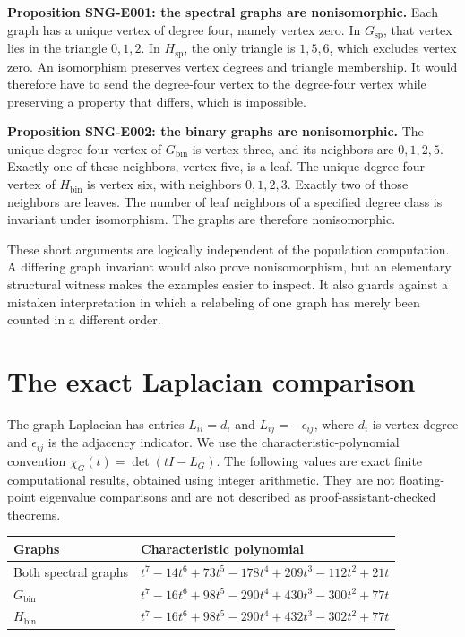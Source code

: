 \documentclass[
  11pt,
  a4paper,
]{report}
\begin{document}
\textbf{Proposition SNG-E001: the spectral graphs are nonisomorphic.}
Each graph has a unique vertex of degree four, namely vertex zero. In
\(G_{\mathrm{sp}}\), that vertex lies in the triangle \(0,1,2\). In
\(H_{\mathrm{sp}}\), the only triangle is \(1,5,6\), which excludes
vertex zero. An isomorphism preserves vertex degrees and triangle
membership. It would therefore have to send the degree-four vertex to
the degree-four vertex while preserving a property that differs, which
is impossible.

\textbf{Proposition SNG-E002: the binary graphs are nonisomorphic.} The
unique degree-four vertex of \(G_{\mathrm{bin}}\) is vertex three, and
its neighbors are \(0,1,2,5\). Exactly one of these neighbors, vertex
five, is a leaf. The unique degree-four vertex of \(H_{\mathrm{bin}}\)
is vertex six, with neighbors \(0,1,2,3\). Exactly two of those
neighbors are leaves. The number of leaf neighbors of a specified degree
class is invariant under isomorphism. The graphs are therefore
nonisomorphic.

These short arguments are logically independent of the population
computation. A differing graph invariant would also prove
nonisomorphism, but an elementary structural witness makes the examples
easier to inspect. It also guards against a mistaken interpretation in
which a relabeling of one graph has merely been counted in a different
order.

\hypertarget{the-exact-laplacian-comparison}{%
\section{The exact Laplacian
comparison}\label{the-exact-laplacian-comparison}}

The graph Laplacian has entries \(L_{ii}=d_i\) and
\(L_{ij}=-\epsilon_{ij}\), where \(d_i\) is vertex degree and
\(\epsilon_{ij}\) is the adjacency indicator. We use the
characteristic-polynomial convention \(\chi_G(t)=\det(tI-L_G)\). The
following values are exact finite computational results, obtained using
integer arithmetic. They are not floating-point eigenvalue comparisons
and are not described as proof-assistant-checked theorems.

\begin{longtable}[]{@{}ll@{}}
\toprule\noalign{}
Graphs & Characteristic polynomial \\
\midrule\noalign{}
\endhead
\bottomrule\noalign{}
\endlastfoot
Both spectral graphs & \(t^7-14t^6+73t^5-178t^4+209t^3-112t^2+21t\) \\
\(G_{\mathrm{bin}}\) & \(t^7-16t^6+98t^5-290t^4+430t^3-300t^2+77t\) \\
\(H_{\mathrm{bin}}\) & \(t^7-16t^6+98t^5-290t^4+432t^3-302t^2+77t\) \\
\end{longtable}
\end{document}
